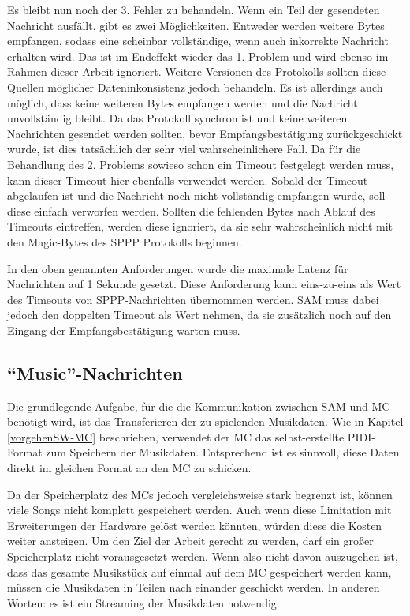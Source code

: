 Es bleibt nun noch der 3. Fehler zu behandeln.
Wenn ein Teil der gesendeten Nachricht ausfällt, gibt es zwei Möglichkeiten.
Entweder werden weitere Bytes empfangen, sodass eine scheinbar vollständige, wenn auch inkorrekte Nachricht erhalten wird.
Das ist im Endeffekt wieder das 1. Problem und wird ebenso im Rahmen dieser Arbeit ignoriert.
Weitere Versionen des Protokolls sollten diese Quellen möglicher Dateninkonsistenz jedoch behandeln.
Es ist allerdings auch möglich, dass keine weiteren Bytes empfangen werden und die Nachricht unvollständig bleibt.
Da das Protokoll synchron ist und keine weiteren Nachrichten gesendet werden sollten, bevor Empfangsbestätigung zurückgeschickt wurde, ist dies tatsächlich der sehr viel wahrscheinlichere Fall.
Da für die Behandlung des 2. Problems sowieso schon ein Timeout festgelegt werden muss, kann dieser Timeout hier ebenfalls verwendet werden.
Sobald der Timeout abgelaufen ist und die Nachricht noch nicht vollständig empfangen wurde, soll diese einfach verworfen werden.
Sollten die fehlenden Bytes nach Ablauf des Timeouts eintreffen, werden diese ignoriert, da sie sehr wahrscheinlich nicht mit den Magic-Bytes des \ac{SPPP} Protokolls beginnen.

In den oben genannten Anforderungen wurde die maximale Latenz für Nachrichten auf 1 Sekunde gesetzt.
Diese Anforderung kann eins-zu-eins als Wert des Timeouts von \ac{SPPP}-Nachrichten übernommen werden.
\ac{SAM} muss dabei jedoch den doppelten \ac{Timeout} als Wert nehmen, da sie zusätzlich noch auf den Eingang der Empfangsbestätigung warten muss.

\subsection{\enquote{Music}-Nachrichten} \label{SPPP-Pidi-Messages}

Die grundlegende Aufgabe, für die die Kommunikation zwischen \ac{SAM} und \ac{MC} benötigt wird, ist das Transferieren der zu spielenden Musikdaten.
Wie in Kapitel \ref{vorgehenSW-MC} beschrieben, verwendet der \ac{MC} das selbst-erstellte \ac{PIDI}-Format zum Speichern der Musikdaten.
Entsprechend ist es sinnvoll, diese Daten direkt im gleichen Format an den \ac{MC} zu schicken.

Da der Speicherplatz des \ac{MC}s jedoch vergleichsweise stark begrenzt ist, können viele Songs nicht komplett gespeichert werden.
Auch wenn diese Limitation mit Erweiterungen der Hardware gelöst werden könnten, würden diese die Kosten weiter ansteigen.
Um den Ziel der Arbeit gerecht zu werden, darf ein großer Speicherplatz nicht vorausgesetzt werden.
Wenn also nicht davon auszugehen ist, dass das gesamte Musikstück auf einmal auf dem \ac{MC} gespeichert werden kann, müssen die Musikdaten in Teilen nach einander geschickt werden.
In anderen Worten: es ist ein Streaming der Musikdaten notwendig.

